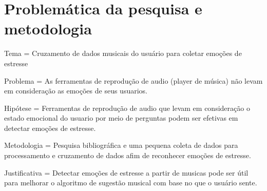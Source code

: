 \chapter{Problemática da pesquisa e metodologia}

Tema = Cruzamento de dados musicais do usuário para coletar emoções de estresse

Problema = As ferramentas de reprodução de audio (player de música) não levam em consideração as emoções de seus usuarios.

Hipótese = Ferramentas de reprodução de audio que levam em consideração o estado emocional do usuario por meio de perguntas podem ser efetivas em detectar emoções de estresse.

Metodologia = Pesquisa bibliográfica e uma pequena coleta de dados para processamento e cruzamento de dados afim de reconhecer emoções de estresse.

Justificativa = Detectar emoções de estresse a partir de musicas pode ser útil para melhorar o algoritmo de sugestão musical com base no que o usuário sente.


